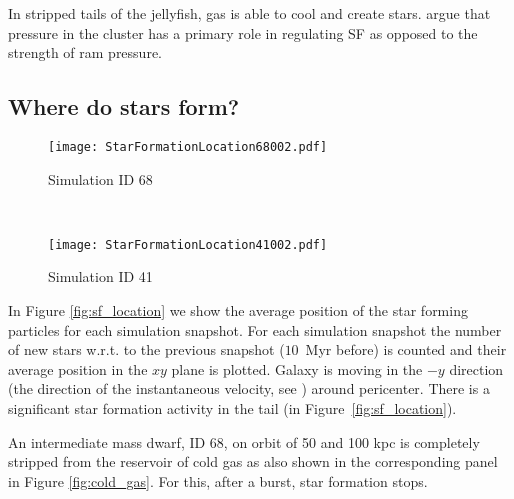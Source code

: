 In stripped tails of the jellyfish, gas is able to cool and create stars. \citet{Tonnesen2012} argue that pressure in the cluster has a primary role in regulating SF as opposed to the strength of ram pressure.


\subsection{Where do stars form?}
\begin{figure*}
\centering
\begin{subfigure}[t]{0.7\textwidth}
\centering
\texttt{[image: StarFormationLocation68002.pdf]}
\caption{Simulation ID 68}
\end{subfigure}\\[2ex]
\begin{subfigure}[t]{0.7\textwidth}
\centering
\texttt{[image: StarFormationLocation41002.pdf]}
\caption{Simulation ID 41}
\end{subfigure}
\caption{Star formation location around first pericenter passage for simulation ID 68 and 41. Each subpanel corresponds to a different pericenter.
The size of the marker is proportional to the number of stars born in that time interval.
Markers are colored using the time from pericenter normalized with the radial period.
In correspondence of pericenter passage an intense star formation activity is registered in the gaseous tail.}
\label{fig:sf_location}
\end{figure*}
In Figure \ref{fig:sf_location} we show the average position of the star forming particles for each simulation snapshot.
For each simulation snapshot the number of new stars w.r.t. to the previous snapshot ($10$~Myr before) is counted and their average position in the $xy$ plane is plotted.
Galaxy is moving in the $-y$ direction (the direction of the instantaneous velocity, see ) around pericenter.
There is a significant star formation activity in the tail (in Figure~\ref{fig:sf_location}).

An intermediate mass dwarf, ID 68, on orbit of 50 and 100 kpc is completely stripped from the reservoir of cold gas as also shown in the corresponding panel in Figure \ref{fig:cold_gas}. For this, after a burst, star formation stops.

